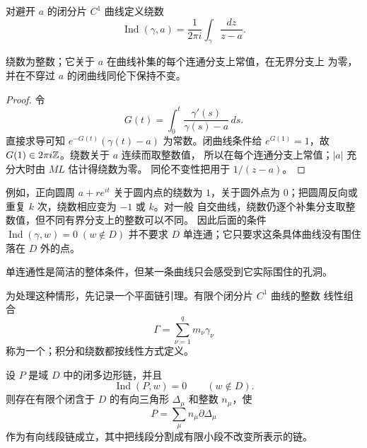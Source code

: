 对避开 \(a\) 的闭分片 \(C^1\) 曲线定义绕数
\[
 \operatorname{Ind}(\gamma,a)
 =\frac1{2\pi i}\int_\gamma\frac{dz}{z-a}.
\]

\begin{proposition}[绕数的基本性质]
\label{prop:winding-number-properties}
绕数为整数；它关于 \(a\) 在曲线补集的每个连通分支上常值，在无界分支上
为零，并在不穿过 \(a\) 的闭曲线同伦下保持不变。
\end{proposition}

\begin{proof}
令
\[
 G(t)=\int_0^t\frac{\gamma'(s)}{\gamma(s)-a}\,ds.
\]
直接求导可知 \(e^{-G(t)}(\gamma(t)-a)\) 为常数。闭曲线条件给
\(e^{G(1)}=1\)，故 \(G(1)\in2\pi i\mathbb{Z}\)。绕数关于 \(a\) 连续而取整数值，
所以在每个连通分支上常值；\(|a|\) 充分大时由 \(ML\) 估计得绕数为零。
同伦不变性把用于
\(1/(z-a)\)。
\end{proof}

例如，正向圆周 \(a+re^{it}\) 关于圆内点的绕数为 \(1\)，关于圆外点为
\(0\)；把圆周反向或重复 \(k\) 次，绕数相应变为 \(-1\) 或 \(k\)。对一般
自交曲线，绕数仍逐个补集分支取整数值，但不同有界分支上的整数可以不同。
因此后面的条件 \(\operatorname{Ind}(\gamma,w)=0\;(w\notin D)\) 并不要求
\(D\) 单连通；它只要求这条具体曲线没有围住落在 \(D\) 外的点。

单连通性是简洁的整体条件，但某一条曲线只会感受到它实际围住的孔洞。

为处理这种情形，先记录一个平面链引理。有限个闭分片 \(C^1\) 曲线的整数
线性组合
\[
 \Gamma=\sum_{\nu=1}^q m_\nu\gamma_\nu
\]
称为一个；积分和绕数都按线性方式定义。

\begin{lemma}[平面多边形链引理]
\label{lem:planar-polygonal-chain}
设 \(P\) 是域 \(D\) 中的闭多边形链，并且
\[
 \operatorname{Ind}(P,w)=0\qquad(w\notin D).
\]
则存在有限个闭含于 \(D\) 的有向三角形 \(\Delta_\mu\) 和整数
\(n_\mu\)，使
\[
 P=\sum_\mu n_\mu\partial\Delta_\mu
\]
作为有向线段链成立，其中把线段分割成有限小段不改变所表示的链。
\end{lemma}

